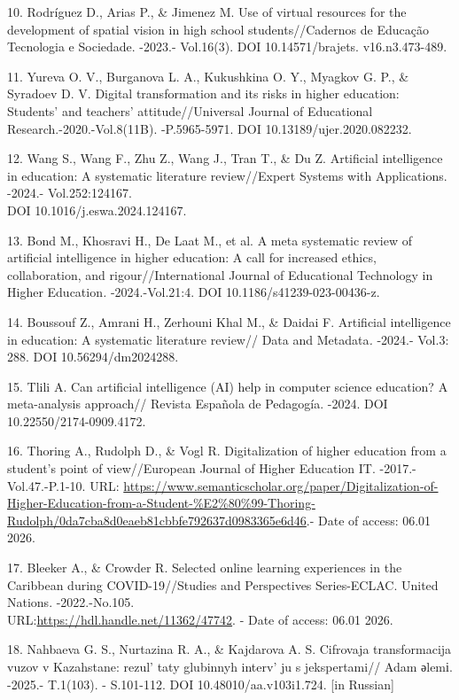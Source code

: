 \begin{refs}
10. Rodríguez D., Arias P., \& Jimenez M. Use of virtual resources for
the development of spatial vision in high school students//Cadernos de
Educação Tecnologia e Sociedade. -2023.- Vol.16(3). DOI
10.14571/brajets. v16.n3.473-489.

11. Yureva O. V., Burganova L. A., Kukushkina O. Y., Myagkov G. P., \&
Syradoev D. V. Digital transformation and its risks in higher education:
Students' and teachers' attitude//Universal Journal of Educational
Research.-2020.-Vol.8(11B). -P.5965-5971. DOI 10.13189/ujer.2020.082232.

12. Wang S., Wang F., Zhu Z., Wang J., Tran T., \& Du Z. Artificial
intelligence in education: A systematic literature review//Expert
Systems with Applications. -2024.- Vol.252:124167.\\
DOI 10.1016/j.eswa.2024.124167.

13. Bond M., Khosravi H., De Laat M., et al. A meta systematic review of
artificial intelligence in higher education: A call for increased
ethics, collaboration, and rigour//International Journal of Educational
Technology in Higher Education\emph{.} -2024.-Vol.21:4. DOI
10.1186/s41239-023-00436-z.

14. Boussouf Z., Amrani H., Zerhouni Khal M., \& Daidai F. Artificial
intelligence in education: A systematic literature review// Data and
Metadata\emph{.} -2024.- Vol.3: 288. DOI 10.56294/dm2024288.

15. Tlili A. Can artificial intelligence (AI) help in computer science
education? A meta-analysis approach// Revista Española de Pedagogía.
-2024. DOI 10.22550/2174-0909.4172.

16. Thoring A., Rudolph D., \& Vogl R. Digitalization of higher
education from a student's point of view//European Journal of Higher
Education IT. -2017.- Vol.47.-P.1-10. URL:
\url{https://www.semanticscholar.org/paper/Digitalization-of-Higher-Education-from-a-Student-\%E2\%80\%99-Thoring-Rudolph/0da7cba8d0eaeb81cbbfe792637d0983365e6d46}.-
Date of access: 06.01 2026.

17. Bleeker A., \& Crowder R. Selected online learning experiences in
the Caribbean during COVID-19//Studies and Perspectives Series-ECLAC.
United Nations. -2022.-No.105.\\
URL:\url{https://hdl.handle.net/11362/47742}. - Date of access: 06.01
2026.

18. Nahbaeva G. S., Nurtazina R. A., \& Kajdarova A. S. Cifrovaja
transformacija vuzov v Kazahstane: rezul' taty glubinnyh
interv' ju s jekspertami// Adam әlemі. -2025.- T.1(103).
- S.101-112. DOI 10.48010/aa.v103i1.724. {[}in Russian{]}


\end{refs}
